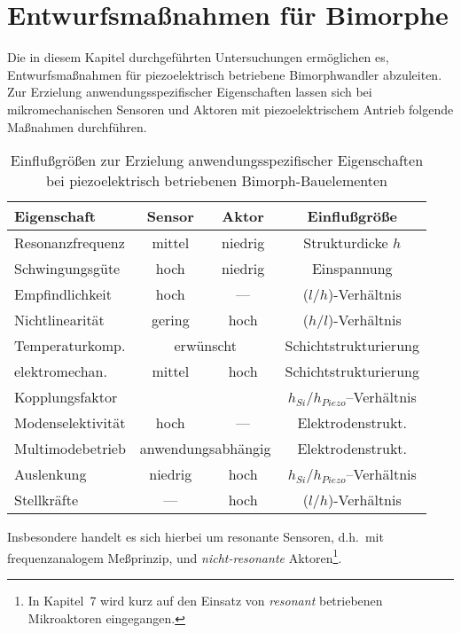\section{Entwurfsmaßnahmen für Bimorphe}

Die in diesem Kapitel durchgeführten Untersuchungen ermöglichen es,
Entwurfsmaßnahmen für piezoelektrisch betriebene Bimorphwandler abzuleiten.
Zur Erzielung anwendungsspezifischer Eigenschaften lassen sich bei
mikromechanischen Sensoren und Aktoren mit piezoelektrischem Antrieb
folgende Maßnahmen durchführen.
\begin{table}[htb]
\caption{\label{tabsenakt}
 Einflußgrößen zur Erzielung anwendungsspezifischer Eigenschaften
 bei piezoelektrisch betriebenen Bimorph-Bauelementen}
\begin{center}
\begin{tabular}{|l||c|c||c|}
\hline
 Eigenschaft      &  Sensor  &  Aktor  &  Einflußgröße  \\
\hline \hline
 Resonanzfrequenz & mittel & niedrig & Strukturdicke $h$\\
\hline
 Schwingungsgüte  &  hoch   & niedrig & Einspannung \\
\hline
 Empfindlichkeit  & hoch & --- & ($l/h$)-Verhältnis \\
\hline
 Nichtlinearität  & gering   & hoch  & ($h/l$)-Verhältnis \\
\hline
 Temperaturkomp.  & \multicolumn{2}{c||}{erwünscht} & Schichtstrukturierung \\
\hline
 elektromechan.   &  mittel  & hoch  & Schichtstrukturierung \\
 Kopplungsfaktor  &          &       & $h_{Si}/h_{Piezo}$--Verhältnis \\
\hline
 Modenselektivität & hoch  & --- & Elektrodenstrukt. \\
\hline
 Multimodebetrieb  & \multicolumn{2}{c||}{anwendungsabhängig}
                   &  Elektrodenstrukt. \\
\hline
 Auslenkung        & niedrig & hoch & $h_{Si}/h_{Piezo}$--Verhältnis \\
\hline
 Stellkräfte       & ---  & hoch  &   ($l/h$)-Verhältnis \\
\hline
\end{tabular}
\end{center}
\end{table}
Insbesondere handelt es sich hierbei um resonante Sensoren, d.h.\ mit
frequenzanalogem Meßprinzip, und {\em nicht-resonante}
Aktoren\footnote{In Kapitel~7 wird kurz auf den
Einsatz von {\em resonant} betriebenen Mikroaktoren eingegangen.}.



